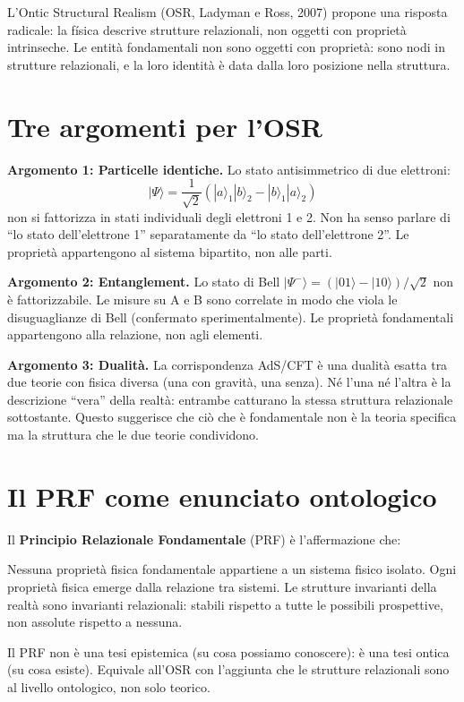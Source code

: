\documentclass[11.5pt,a4paper,openany]{book}
\theoremstyle{remark}
\begin{document}
L'Ontic Structural Realism (OSR, Ladyman e Ross, 2007) propone una risposta radicale: la física descrive strutture relazionali, non oggetti con proprietà intrinseche. Le entità fondamentali non sono oggetti con proprietà: sono nodi in strutture relazionali, e la loro identità è data dalla loro posizione nella struttura.

\section{Tre argomenti per l'OSR}

\textbf{Argomento 1: Particelle identiche.} Lo stato antisimmetrico di due elettroni:
\[
|\Psi\rangle = \frac{1}{\sqrt{2}}\left(|a\rangle_1|b\rangle_2 - |b\rangle_1|a\rangle_2\right)
\]
non si fattorizza in stati individuali degli elettroni 1 e 2. Non ha senso parlare di ``lo stato dell'elettrone 1'' separatamente da ``lo stato dell'elettrone 2''. Le proprietà appartengono al sistema bipartito, non alle parti.

\textbf{Argomento 2: Entanglement.} Lo stato di Bell $|\Psi^-\rangle = (|01\rangle - |10\rangle)/\sqrt{2}$ non è fattorizzabile. Le misure su A e B sono correlate in modo che viola le disuguaglianze di Bell (confermato sperimentalmente). Le proprietà fondamentali appartengono alla relazione, non agli elementi.

\textbf{Argomento 3: Dualità.} La corrispondenza AdS/CFT è una dualità esatta tra due teorie con fisica diversa (una con gravità, una senza). Né l'una né l'altra è la descrizione ``vera'' della realtà: entrambe catturano la stessa struttura relazionale sottostante. Questo suggerisce che ciò che è fondamentale non è la teoria specifica ma la struttura che le due teorie condividono.

\section{Il PRF come enunciato ontologico}

Il \textbf{Principio Relazionale Fondamentale} (PRF) è l'affermazione che:
\begin{quoting}
Nessuna proprietà fisica fondamentale appartiene a un sistema fisico isolato. Ogni proprietà fisica emerge dalla relazione tra sistemi. Le strutture invarianti della realtà sono invarianti relazionali: stabili rispetto a tutte le possibili prospettive, non assolute rispetto a nessuna.
\end{quoting}

Il PRF non è una tesi epistemica (su cosa possiamo conoscere): è una tesi ontica (su cosa esiste). Equivale all'OSR con l'aggiunta che le strutture relazionali sono al livello ontologico, non solo teorico.
\end{document}
